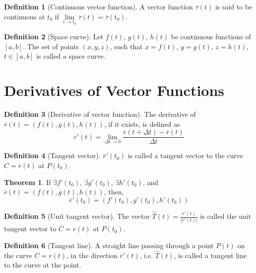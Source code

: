 \documentclass[fleqn, a4paper, 12pt, twoside]{article}
\theoremstyle{definition}
\newtheorem{definition}{Definition}
\theoremstyle{theorem}
\newtheorem{theorem}{Theorem}
\begin{document}
{\begin{definition}[Continuous vector function]
	A vector function $\overline{\tau}(t)$ is said to be continuous at $t_0$ if $\lim\limits_{t \to t_0} \overline{\tau}(t) = \overline{\tau}(t_0)$.
\end{definition}

\begin{definition}[Space curve]
	Let $f(t)$, $g(t)$, $h(t)$ be continuous functions of $[a,b]$.
	The set of points $(x,y,z)$, such that $x = f(t)$, $y = g(t)$, $z = h(t)$, $t \in [a,b]$ is called a space curve.
\end{definition}

\section{Derivatives of Vector Functions}

\begin{definition}[Derivative of vector function]
	The derivative of $\overline{r}(t) = \left( f(t), g(t), h(t) \right)$, if it exists, is defined as
	\begin{equation*}
		\overline{r}'(t) = \lim\limits_{\Delta t \to 0} \frac{\overline{r}(t + \Delta t) - \overline{r}(t)}{\Delta t}
	\end{equation*}
\end{definition}

\begin{definition}[Tangent vector]
	$\overline{r}'(t_0)$ is called a tangent vector to the curve $C = \overline{r}(t)$ at $P(t_0)$.
\end{definition}

\begin{theorem}
	If $\exists f'(t_0)$, $\exists g'(t_0)$, $\exists h'(t_0)$, and $\overline{r}(t) = \left( f(t), g(t), h(t) \right)$, then,
	\begin{equation*}
		\overline{r}'(t_0) = \left( f'(t_0), g'(t_0), h'(t_0) \right)
	\end{equation*}
\end{theorem}

\begin{definition}[Unit tangent vector]
	The vector $\hat{T}(t) = \frac{\overline{r}'(t)}{\left| \overline{r}'(t) \right|}$ is called the unit tangent vector to $C = r(t)$ at $P(t_0)$.
\end{definition}

\begin{definition}[Tangent line]
	A straight line passing through a point $P(t)$ on the curve $C = r(t)$, in the direction $\overline{r}'(t)$, i.e. $\hat{T}(t)$, is called a tangent line to the curve at the point.
\end{definition}

}
\end{document}
